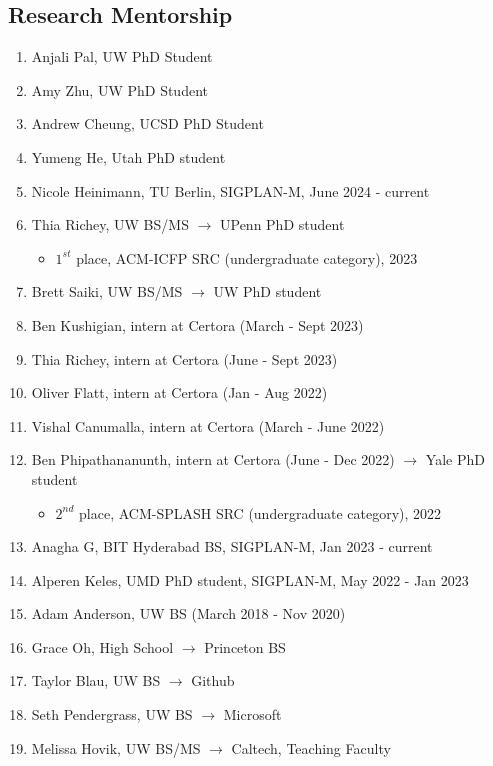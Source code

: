 \documentclass[margin, 10pt]{res} %
\begin{document}
\begin{resume}
\section{Research Mentorship}
\begin{enumerate}
  \item Anjali Pal, UW PhD Student
  \item Amy Zhu, UW PhD Student
  \item Andrew Cheung, UCSD PhD Student
  \item Yumeng He, Utah PhD student
  \item Nicole Heinimann, TU Berlin, SIGPLAN-M, June 2024 - current
  \item Thia Richey, UW BS/MS $\rightarrow$ UPenn PhD student
     \begin{itemize}
       \item $1^{st}$ place, ACM-ICFP SRC (undergraduate category), 2023
     \end{itemize}
  \item Brett Saiki, UW BS/MS $\rightarrow$ UW PhD student
  \item Ben Kushigian, intern at Certora (March - Sept 2023)
  \item Thia Richey, intern at Certora (June - Sept 2023)
  \item Oliver Flatt, intern at Certora (Jan - Aug 2022)
  \item Vishal Canumalla, intern at Certora (March - June 2022)
  \item Ben Phipathananunth, intern at Certora (June - Dec 2022) $\rightarrow$ Yale PhD student
     \begin{itemize}
       \item $2^{nd}$ place, ACM-SPLASH SRC (undergraduate category), 2022
     \end{itemize}
  \item Anagha G, BIT Hyderabad BS, SIGPLAN-M, Jan 2023 - current
  \item Alperen Keles, UMD PhD student, SIGPLAN-M, May 2022 - Jan 2023
  \item Adam Anderson, UW BS (March 2018 - Nov 2020)
  \item Grace Oh, High School $\rightarrow$ Princeton BS
  \item Taylor Blau, UW BS $\rightarrow$ Github
  \item Seth Pendergrass, UW BS $\rightarrow$ Microsoft
  \item Melissa Hovik, UW BS/MS $\rightarrow$ Caltech, Teaching Faculty
\end{enumerate}


\end{resume}
\end{document}
